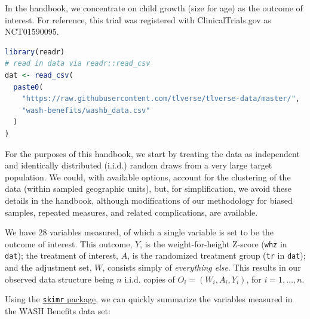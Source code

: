 \documentclass[12pt, krantz2,]{krantz}
\newcommand{\passthrough}[1]{#1}
\theoremstyle{definition}
\theoremstyle{definition}
\theoremstyle{definition}
\newcommand{\1}{\mathbbm{1}}
\begin{document}
In the handbook, we concentrate on child growth (size for age) as the outcome of
interest. For reference, this trial was registered with ClinicalTrials.gov as
NCT01590095.

\begin{lstlisting}[language=R]
library(readr)
# read in data via readr::read_csv
dat <- read_csv(
  paste0(
    "https://raw.githubusercontent.com/tlverse/tlverse-data/master/",
    "wash-benefits/washb_data.csv"
  )
)
\end{lstlisting}

For the purposes of this handbook, we start by treating the data as independent
and identically distributed (i.i.d.) random draws from a very large target
population. We could, with available options, account for the clustering of the
data (within sampled geographic units), but, for simplification, we avoid these
details in the handbook, although modifications of our methodology for biased
samples, repeated measures, and related complications, are available.

We have 28 variables measured, of which a single variable is set to
be the outcome of interest. This outcome, \(Y\), is the weight-for-height Z-score
(\passthrough{\lstinline!whz!} in \passthrough{\lstinline!dat!}); the treatment of interest, \(A\), is the randomized treatment
group (\passthrough{\lstinline!tr!} in \passthrough{\lstinline!dat!}); and the adjustment set, \(W\), consists simply of
\emph{everything else}. This results in our observed data structure being \(n\) i.i.d.
copies of \(O_i = (W_i, A_i, Y_i)\), for \(i = 1, \ldots, n\).

Using the \href{https://CRAN.R-project.org/package=skimr}{\passthrough{\lstinline!skimr!} package}, we can
quickly summarize the variables measured in the WASH Benefits data set:
\end{document}
